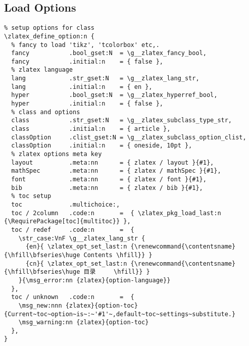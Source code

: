 \subsection{Load Options}
\begin{verbatim}
% setup options for class
\zlatex_define_option:n {
  % fancy to load 'tikz', 'tcolorbox' etc,.
  fancy           .bool_gset:N  = \g__zlatex_fancy_bool,
  fancy           .initial:n    = { false },
  % zlatex language
  lang            .str_gset:N   = \g__zlatex_lang_str,
  lang            .initial:n    = { en },
  hyper           .bool_gset:N  = \g__zlatex_hyperref_bool,
  hyper           .initial:n    = { false },
  % class and options
  class           .str_gset:N   = \g__zlatex_subclass_type_str,
  class           .initial:n    = { article },
  classOption     .clist_gset:N = \g__zlatex_subclass_option_clist,
  classOption     .initial:n    = { oneside, 10pt },
  % zlatex options meta key 
  layout          .meta:nn      = { zlatex / layout }{#1},
  mathSpec        .meta:nn      = { zlatex / mathSpec }{#1},
  font            .meta:nn      = { zlatex / font }{#1},
  bib             .meta:nn      = { zlatex / bib }{#1},
  % toc setup
  toc             .multichoice:,
  toc / 2column   .code:n       =  { \zlatex_pkg_load_last:n {\RequirePackage[toc]{multitoc}} },
  toc / redef     .code:n       =  { 
    \str_case:VnF \g__zlatex_lang_str {
      {en}{ \zlatex_opt_set_last:n {\renewcommand{\contentsname}{\hfill\bfseries\huge Contents \hfill}} }
      {cn}{ \zlatex_opt_set_last:n {\renewcommand{\contentsname}{\hfill\bfseries\huge 目录     \hfill}} }
    }{\msg_error:nn {zlatex}{option-language}}
  },
  toc / unknown   .code:n       =  {
    \msg_new:nnn {zlatex}{option-toc}{Current~toc~option~is~:~'#1'~,default~toc~settings~substitute.}
    \msg_warning:nn {zlatex}{option-toc}
  },
}


\end{verbatim}
